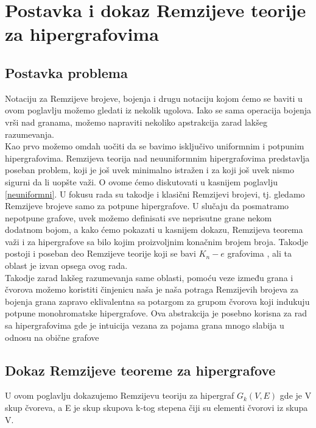 \documentclass[a4paper]{article}
\begin{document}
	\section{Postavka i dokaz Remzijeve teorije za hipergrafovima}
	\subsection{Postavka problema}
	Notaciju za Remzijeve brojeve, bojenja i drugu notaciju kojom ćemo se baviti u ovom poglavlju možemo gledati iz nekolik ugolova. Iako se sama operacija bojenja vrši nad granama, možemo napraviti nekoliko apstrakcija zarad lakšeg razumevanja.\\
	Kao prvo možemo omdah uočiti da se bavimo isključivo uniformnim i potpunim hipergrafovima. Remzijeva teorija nad neuuniformnim hipergrafovima predstavlja poseban problem, koji je još uvek minimalno istražen i za koji još uvek nismo sigurni da li uopšte važi. O ovome ćemo diskutovati u kasnijem poglavlju \ref{neuniformni}. U fokusu rada su takodje i klasični Remzijevi brojevi, tj. gledamo Remzijeve brojeve samo za potpune hipergrafove. U slučaju da posmatramo nepotpune grafove, uvek možemo definisati sve neprisutne grane nekom dodatnom bojom, a kako ćemo pokazati u kasnijem dokazu, Remzijeva teorema važi i za hipergrafove sa bilo kojim proizvoljnim konačnim brojem broja. Takodje postoji i poseban deo Remzijeve teorije koji se bavi $K_n - e$ grafovima \cite{pregled}, ali ta oblast je izvan opsega ovog rada.\\
	Takodje zarad lakšeg razumevanja same oblasti, pomoću veze između grana i čvorova možemo koristiti činjenicu naša je naša potraga Remzijevih brojeva za bojenja grana zapravo eklivalentna sa potargom za grupom čvorova koji indukuju potpune monohromatske hipergrafove. Ova abstrakcija je posebno korisna za rad sa hipergrafovima gde je intuicija vezana za pojama grana mnogo slabija u odnosu na obične grafove
	\subsection{Dokaz Remzijeve teoreme za hipergrafove}
	U ovom poglavlju dokazujemo Remzijevu teoriju %
	za hipergraf $ G_{k}(V, E)$ gde je V skup čvoreva, a E je skup skupova k-tog stepena čiji su elementi čvorovi iz skupa V.
	
\end{document}
